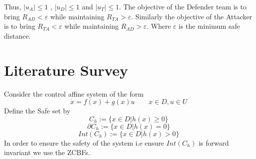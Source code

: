 \documentclass[11pt]{article}
\theoremstyle{definition}
\theoremstyle{remark}
\begin{document}
Thus, $|u_A| \leq 1$ , $|u_D| \leq 1$ and $|u_T| \leq 1$.  
The objective of the Defender team is to bring $R_{AD} < \varepsilon$ while maintaining $R_{TA} > \varepsilon$. Similarly the objective of the Attacker is to bring $R_{TA} < \varepsilon$ while maintaining $R_{AD} > \varepsilon$. Where $\varepsilon$ is the minimum safe distance.  


\section{Literature Survey}\label{sec:3}
Consider the control affine system of the form
\begin{equation} \label{eqn: control_affine}
 \dot{x} = f(x) + g(x) u \qquad x \in D, u \in U
\end{equation}
Define the Safe set by
\begin{equation} \label{eqn:safety}
    C_h := \{x \in D | h(x) \geq 0\}
\end{equation}
\begin{equation*}
    \partial C_h := \{x \in D | h(x) = 0\}
\end{equation*}
\begin{equation*}
    Int(C_h) := \{x \in D | h(x) > 0\}
\end{equation*}
In order to ensure the safety of the system i.e ensure $Int(C_h)$ is forward invariant we use the ZCBFs.
\end{document}
